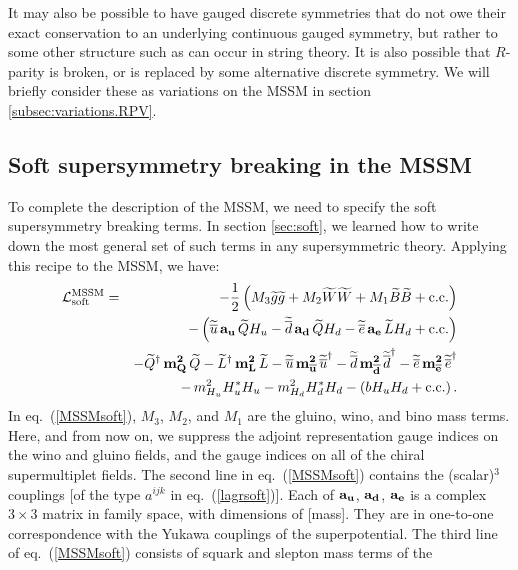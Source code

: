 \documentclass[12pt]{article}
\def\beq{\begin{eqnarray}}
\def\eeq{\end{eqnarray}}
\def\sbar{\overline}
\def\stilde{\widetilde}
\def\lagr{{\cal L}}
\def\conj{{{\rm c.c.}}}
\def\half{{1\over 2}}
\begin{document}
It may also be possible to have gauged discrete symmetries that do not owe
their exact conservation to an underlying continuous gauged symmetry, but
rather to some other structure such as can occur in string theory. It is
also possible that $R$-parity is broken, or is replaced by some
alternative discrete symmetry. We will briefly consider these as
variations on the MSSM in section \ref{subsec:variations.RPV}.

\subsection{Soft supersymmetry breaking in the
MSSM}\label{subsec:mssm.soft}
\setcounter{equation}{0}

To complete the description of the MSSM, we need to specify the soft
supersymmetry breaking terms. In section \ref{sec:soft}, we learned how to
write down the most general set of such terms in any supersymmetric
theory. Applying this recipe to the MSSM, we have: 
\beq
\lagr_{\rm soft}^{\rm MSSM} &=& -\half\left ( M_3 \stilde g\stilde g
+ M_2 \stilde W \stilde W + M_1 \stilde B\stilde B 
+\conj \right )
\nonumber
\\
&&
-\left ( \stilde {\sbar u} \,{\bf a_u}\, \stilde Q H_u
- \stilde {\sbar d} \,{\bf a_d}\, \stilde Q H_d
- \stilde {\sbar e} \,{\bf a_e}\, \stilde L H_d
+ \conj \right ) 
\nonumber
\\
&&
-\stilde Q^\dagger \, {\bf m^2_{Q}}\, \stilde Q
-\stilde L^\dagger \,{\bf m^2_{L}}\,\stilde L
-\stilde {\sbar u} \,{\bf m^2_{{\sbar u}}}\, {\stilde {\sbar u}}^\dagger
-\stilde {\sbar d} \,{\bf m^2_{{\sbar d}}} \, {\stilde {\sbar d}}^\dagger
-\stilde {\sbar e} \,{\bf m^2_{{\sbar e}}}\, {\stilde {\sbar e}}^\dagger
\nonumber \\
&&
- \, m_{H_u}^2 H_u^* H_u - m_{H_d}^2 H_d^* H_d
- \left ( b H_u H_d + \conj \right ) .
\label{MSSMsoft}
\eeq
In eq.~(\ref{MSSMsoft}), $M_3$, $M_2$, and $M_1$ are the gluino, wino, and
bino mass terms. Here, and from now on, we suppress the adjoint
representation gauge indices on the wino and gluino fields, and the gauge
indices on all of the chiral supermultiplet fields. The second line in
eq.~(\ref{MSSMsoft}) contains the (scalar)$^3$ couplings [of the type
$a^{ijk}$ in eq.~(\ref{lagrsoft})]. Each of ${\bf a_u}$, ${\bf a_d}$,
${\bf a_e}$ is a complex $3\times 3$ matrix in family space, with
dimensions of [mass]. They are in one-to-one correspondence with the
Yukawa couplings of the superpotential. The third line of
eq.~(\ref{MSSMsoft}) consists of squark and slepton mass terms of the
\end{document}
